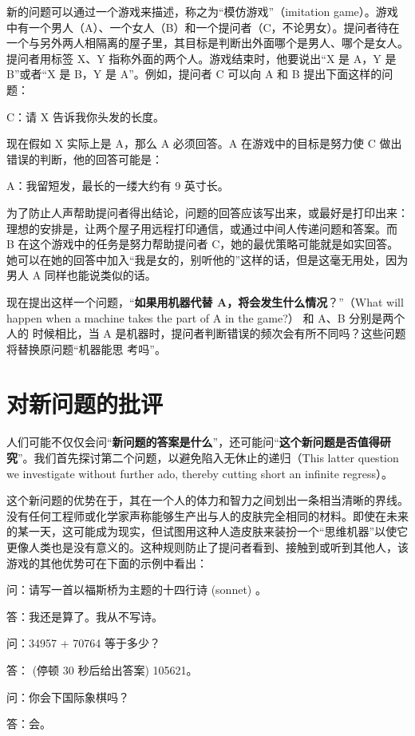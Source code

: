 \documentclass[12pt,a4paper,twoside]{article}
\begin{document}
新的问题可以通过一个游戏来描述，称之为“模仿游戏”（imitation game）。游戏中有一个男人（A）、一个女人（B）和一个提问者（C，不论男女）。提问者待在一个与另外两人相隔离的屋子里，其目标是判断出外面哪个是男人、哪个是女人。提问者用标签 X、Y 指称外面的两个人。游戏结束时，他要说出“X 是 A，Y 是 B”或者“X 是 B，Y 是 A”。例如，提问者 C 可以向 A 和 B 提出下面这样的问题：

C：请 X 告诉我你头发的长度。

现在假如 X 实际上是 A，那么 A 必须回答。A 在游戏中的目标是努力使 C 做出错误的判断，他的回答可能是：

A：我留短发，最长的一缕大约有 9 英寸长。

为了防止人声帮助提问者得出结论，问题的回答应该写出来，或最好是打印出来：理想的安排是，让两个屋子用远程打印通信，或通过中间人传递问题和答案。而 B 在这个游戏中的任务是努力帮助提问者 C，她的最优策略可能就是如实回答。她可以在她的回答中加入“我是女的，别听他的”这样的话，但是这毫无用处，因为男人 A 同样也能说类似的话。

现在提出这样一个问题，“\textbf{如果用机器代替 A，将会发生什么情况}？”（What will happen when a machine takes the part of A in the game?） 和 A、B 分别是两个人的 时候相比，当 A 是机器时，提问者判断错误的频次会有所不同吗？这些问题将替换原问题“机器能思 考吗”。




\section{对新问题的批评}
人们可能不仅仅会问“\textbf{新问题的答案是什么}”，还可能问“\textbf{这个新问题是否值得研究}”。我们首先探讨第二个问题，以避免陷入无休止的递归（This latter question we investigate without further ado, thereby cutting short an infinite regress）。

这个新问题的优势在于，其在一个人的体力和智力之间划出一条相当清晰的界线。没有任何工程师或化学家声称能够生产出与人的皮肤完全相同的材料。即使在未来的某一天，这可能成为现实，但试图用这种人造皮肤来装扮一个“思维机器”以使它更像人类也是没有意义的。这种规则防止了提问者看到、接触到或听到其他人，该游戏的其他优势可在下面的示例中看出：

问：请写一首以福斯桥为主题的十四行诗 (sonnet) 。

答：我还是算了。我从不写诗。

问：34957 + 70764 等于多少？

答： (停顿 30 秒后给出答案) 105621。

问：你会下国际象棋吗？

答：会。
\end{document}
